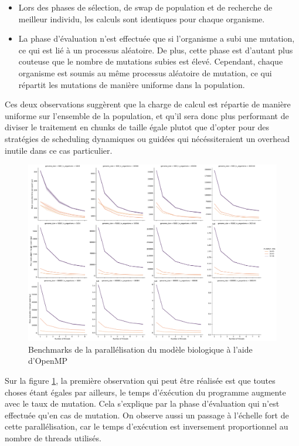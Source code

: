\documentclass[a4paper, 10pt, twoside]{article}
\begin{document}
\begin{itemize}
	\item Lors des phases de sélection, de swap de population et de recherche de meilleur individu, les calculs sont identiques pour chaque organisme.
	\item La phase d'évaluation n'est effectuée que si l'organisme a subi une mutation, ce qui est lié à un processus aléatoire. De plus, cette phase est d'autant plus couteuse que le nombre de mutations subies est élevé. Cependant, chaque organisme est soumis au même processus aléatoire de mutation, ce qui répartit les mutations de manière uniforme dans la population.
\end{itemize}

Ces deux observations suggèrent que la charge de calcul est répartie de manière uniforme sur l'ensemble de la population, et qu'il sera donc plus performant de diviser le traitement en chunks de taille égale plutot que d'opter pour des stratégies de scheduling dynamiques ou guidées qui nécéssiteraient un overhead inutile dans ce cas particulier.

\begin{figure}[htbp]
	\centering
	\includegraphics[width=0.7\linewidth]{img/benchmark_omp_static.pdf}
	\caption{Benchmarks de la parallélisation du modèle biologique à l'aide d'OpenMP}
	\label{fig:benchmarks/omp}
\end{figure}

Sur la figure \ref{fig:benchmarks/omp}, la première observation qui peut être réalisée est que toutes choses étant égales par ailleurs, le temps d'éxécution du programme augmente avec le taux de mutation. Cela s'explique par la phase d'évaluation qui n'est effectuée qu'en cas de mutation. On observe aussi un passage à l'échelle fort de cette parallélisation, car le temps d'exécution est inversement proportionnel au nombre de threads utilisés.
\end{document}
